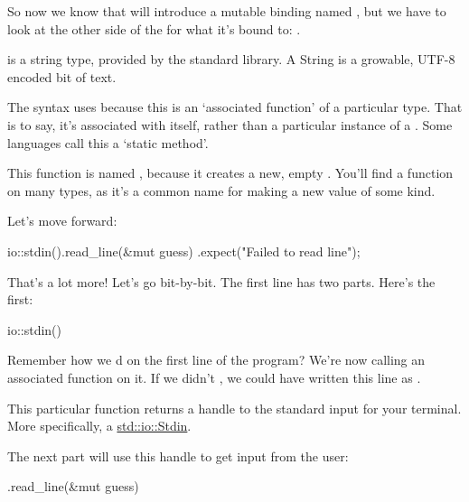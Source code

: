\blank

So now we know that  will introduce a mutable binding named , but we have to look at the 
other side of the \code{=} for what it’s bound to: .

\blank

 is a string type, provided by the standard library. A String is a growable, UTF-8 encoded bit of text.

\blank

The  syntax uses \code{::} because this is an ‘associated function’ of a particular type. That is to say, it’s
associated with  itself, rather than a particular instance of a . Some languages call this a 
‘static method’.

\blank

This function is named , because it creates a new, empty . You’ll find a  function on 
many types, as it’s a common name for making a new value of some kind.

\blank

Let’s move forward:

\begin{rustc}
    io::stdin().read_line(&mut guess)
        .expect("Failed to read line");

\end{rustc}

That’s a lot more! Let’s go bit-by-bit. The first line has two parts. Here’s the first:

\begin{rustc}
io::stdin()
\end{rustc}

Remember how we d  on the first line of the program? We’re now calling an associated 
function on it. If we didn’t , we could have written this line as .

\blank

This particular function returns a handle to the standard input for your terminal. More specifically, a 
\href{https://doc.rust-lang.org/std/io/struct.Stdin.html}{std::io::Stdin}.

\blank

The next part will use this handle to get input from the user:

\begin{rustc}
.read_line(&mut guess)
\end{rustc}

